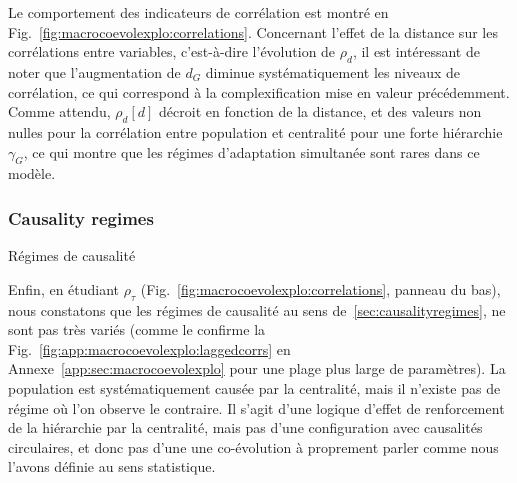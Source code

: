 Le comportement des indicateurs de corrélation est montré en Fig.~\ref{fig:macrocoevolexplo:correlations}. Concernant l'effet de la distance sur les corrélations entre variables, c'est-à-dire l'évolution de $\rho_d$, il est intéressant de noter que l'augmentation de $d_G$ diminue systématiquement les niveaux de corrélation, ce qui correspond à la complexification mise en valeur précédemment. Comme attendu, $\rho_d\left[d\right]$ décroit en fonction de la distance, et des valeurs non nulles pour la corrélation entre population et centralité pour une forte hiérarchie $\gamma_G$, ce qui montre que les régimes d'adaptation simultanée sont rares dans ce modèle.

\subsubsection{Causality regimes}{Régimes de causalité}

Enfin, en étudiant $\rho_{\tau}$ (Fig.~\ref{fig:macrocoevolexplo:correlations}, panneau du bas), nous constatons que les régimes de causalité au sens de~\ref{sec:causalityregimes}, ne sont pas très variés (comme le confirme la Fig.~\ref{fig:app:macrocoevolexplo:laggedcorrs} en Annexe~\ref{app:sec:macrocoevolexplo} pour une plage plus large de paramètres). La population est systématiquement causée par la centralité, mais il n'existe pas de régime où l'on observe le contraire. Il s'agit d'une logique d'effet de renforcement de la hiérarchie par la centralité, mais pas d'une configuration avec causalités circulaires, et donc pas d'une une co-évolution à proprement parler comme nous l'avons définie au sens statistique.









